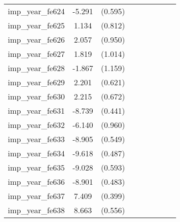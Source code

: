 {\begin{tabular}{l*{4}{cc}}
imp\_year\_fe624&   -5.291\sym{***}&  (0.595)&                  &         &                  &         &                  &         \\
imp\_year\_fe625&    1.134         &  (0.812)&                  &         &                  &         &                  &         \\
imp\_year\_fe626&    2.057\sym{*}  &  (0.950)&                  &         &                  &         &                  &         \\
imp\_year\_fe627&    1.819         &  (1.014)&                  &         &                  &         &                  &         \\
imp\_year\_fe628&   -1.867         &  (1.159)&                  &         &                  &         &                  &         \\
imp\_year\_fe629&    2.201\sym{***}&  (0.621)&                  &         &                  &         &                  &         \\
imp\_year\_fe630&    2.215\sym{***}&  (0.672)&                  &         &                  &         &                  &         \\
imp\_year\_fe631&   -8.739\sym{***}&  (0.441)&                  &         &                  &         &                  &         \\
imp\_year\_fe632&   -6.140\sym{***}&  (0.960)&                  &         &                  &         &                  &         \\
imp\_year\_fe633&   -8.905\sym{***}&  (0.549)&                  &         &                  &         &                  &         \\
imp\_year\_fe634&   -9.618\sym{***}&  (0.487)&                  &         &                  &         &                  &         \\
imp\_year\_fe635&   -9.028\sym{***}&  (0.593)&                  &         &                  &         &                  &         \\
imp\_year\_fe636&   -8.901\sym{***}&  (0.483)&                  &         &                  &         &                  &         \\
imp\_year\_fe637&    7.409\sym{***}&  (0.399)&                  &         &                  &         &                  &         \\
imp\_year\_fe638&    8.663\sym{***}&  (0.556)&                  &         &                  &         &                  &         \\

\end{tabular}}
